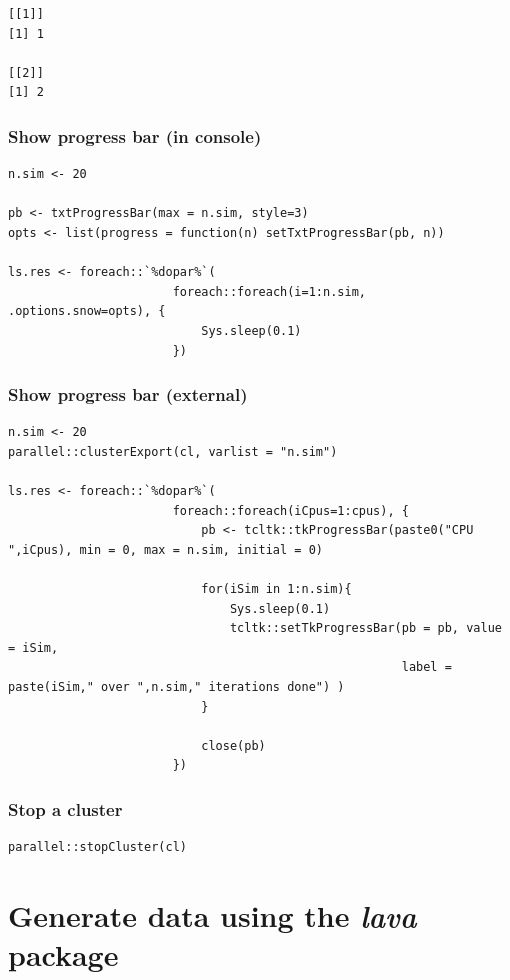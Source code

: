 \documentclass{article}
\begin{document}
\begin{verbatim}
[[1]]
[1] 1

[[2]]
[1] 2
\end{verbatim}

\subsubsection{Show progress bar (in console)}
\label{sec:org79d63bd}

\lstset{language=r,label= ,caption= ,captionpos=b,numbers=none}
\begin{lstlisting}
n.sim <- 20

pb <- txtProgressBar(max = n.sim, style=3)
opts <- list(progress = function(n) setTxtProgressBar(pb, n))

ls.res <- foreach::`%dopar%`(
					   foreach::foreach(i=1:n.sim, .options.snow=opts), {
						   Sys.sleep(0.1)
					   })
\end{lstlisting}

\subsubsection{Show progress bar (external)}
\label{sec:orgae04d7a}

\lstset{language=r,label= ,caption= ,captionpos=b,numbers=none}
\begin{lstlisting}
n.sim <- 20
parallel::clusterExport(cl, varlist = "n.sim")

ls.res <- foreach::`%dopar%`(
					   foreach::foreach(iCpus=1:cpus), {
						   pb <- tcltk::tkProgressBar(paste0("CPU ",iCpus), min = 0, max = n.sim, initial = 0)

						   for(iSim in 1:n.sim){
							   Sys.sleep(0.1)
							   tcltk::setTkProgressBar(pb = pb, value = iSim,
													   label = paste(iSim," over ",n.sim," iterations done") )
						   }

						   close(pb)
					   })
\end{lstlisting}

\subsubsection{Stop a cluster}
\label{sec:org69f2af9}

\lstset{language=r,label= ,caption= ,captionpos=b,numbers=none}
\begin{lstlisting}
parallel::stopCluster(cl)
\end{lstlisting}

\section{Generate data using the \emph{lava} package}
\label{sec:org44f9ff2}
\end{document}
